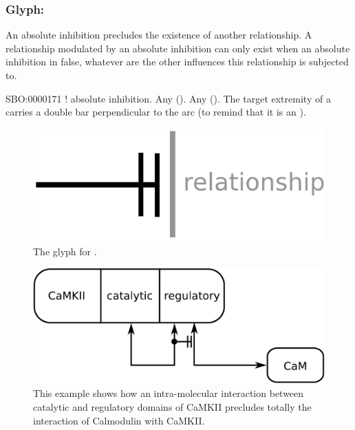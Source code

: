 \color{red}

\subsubsection{Glyph: }\label{sec:absoluteInhibition}

An absolute inhibition precludes the existence of another relationship. A relationship modulated by an absolute inhibition can only exist when an absolute inhibition in false, whatever are the other influences this relationship is subjected to.

\begin{glyphDescription}
 \glyphSboTerm SBO:0000171 ! absolute inhibition.
 \glyphOrigin Any  ().
 \glyphTarget Any  ().
 \glyphEndPoint The target extremity of a  carries a double bar perpendicular to the arc (to remind that it is an ).
 \end{glyphDescription}

\begin{figure}[H]
  \centering
  \includegraphics[scale = 0.5]{images/absoluteInhibition}
  \caption{The \PD glyph for .}
  \label{fig:absoluteInhibition}
\end{figure}

\begin{figure}[H]
  \centering
  \includegraphics[scale = 0.5]{examples/ex-absoluteInhibition}
  \caption{This example shows how an intra-molecular interaction between catalytic and regulatory domains of CaMKII precludes totally the interaction of Calmodulin with CaMKII.}
  \label{fig:ex-absoluteInhibition}
\end{figure}

\normalcolor